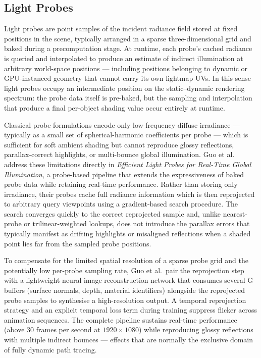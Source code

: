 \documentclass[12pt]{article}
\begin{document}
\subsection{Light Probes}
\label{subsec:light-probes}

Light probes are point samples of the incident radiance field stored at
fixed positions in the scene, typically arranged in a sparse
three-dimensional grid and baked during a precomputation stage. At
runtime, each probe's cached radiance is queried and interpolated to
produce an estimate of indirect illumination at arbitrary world-space
positions --- including positions belonging to dynamic or GPU-instanced
geometry that cannot carry its own lightmap UVs. In this sense light
probes occupy an intermediate position on the static--dynamic rendering
spectrum: the probe data itself is pre-baked, but the sampling and
interpolation that produce a final per-object shading value occur
entirely at runtime.

Classical probe formulations encode only low-frequency diffuse
irradiance --- typically as a small set of spherical-harmonic
coefficients per probe --- which is sufficient for soft ambient
shading but cannot reproduce glossy reflections, parallax-correct
highlights, or multi-bounce global illumination. Guo et al.\
\cite{Guo2022} address these limitations directly in \emph{Efficient
Light Probes for Real-Time Global Illumination}, a probe-based pipeline
that extends the expressiveness of baked probe data while retaining
real-time performance. Rather than storing only irradiance, their probes
cache full radiance information which is then reprojected to arbitrary
query viewpoints using a gradient-based search procedure. The search
converges quickly to the correct reprojected sample and, unlike
nearest-probe or trilinear-weighted lookups, does not introduce the
parallax errors that typically manifest as drifting highlights or
misaligned reflections when a shaded point lies far from the sampled
probe positions.

To compensate for the limited spatial resolution of a sparse probe grid
and the potentially low per-probe sampling rate, Guo et al.\ pair the
reprojection step with a lightweight neural image-reconstruction network
that consumes several G-buffers (surface normals, depth, material
identifiers) alongside the reprojected probe samples to synthesise a
high-resolution output. A temporal reprojection strategy and an explicit
temporal loss term during training suppress flicker across animation
sequences. The complete pipeline sustains real-time performance
(above 30 frames per second at $1920 \times 1080$) while reproducing
glossy reflections with multiple indirect bounces --- effects that are
normally the exclusive domain of fully dynamic path tracing.
\end{document}
